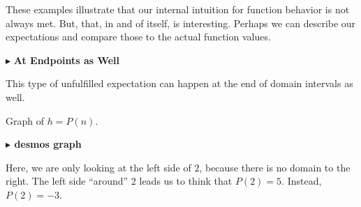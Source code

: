\documentclass{ximera}
\begin{document}
These examples illustrate that our internal intuition for function behavior is not always met.  But, that, in and of itself, is interesting.  Perhaps we can describe our expectations and compare those to the actual function values. 





$\blacktriangleright$ \textbf{At Endpoints as Well}

This type of unfulfilled expectation can happen at the end of domain intervals as well.






Graph of $h = P(n)$.

\begin{image}
\end{image}







\begin{onlineOnly}
\textbf{\textcolor{blue!55!black}{$\blacktriangleright$ desmos graph}} 
\begin{center}
\end{center}
\end{onlineOnly}






Here, we are only looking at the left side of $2$, because there is no domain to the right.  The left side ``around'' $2$ leads us to think that $P(2) = 5$.  Instead, $P(2) = -3$. 
\end{document}
